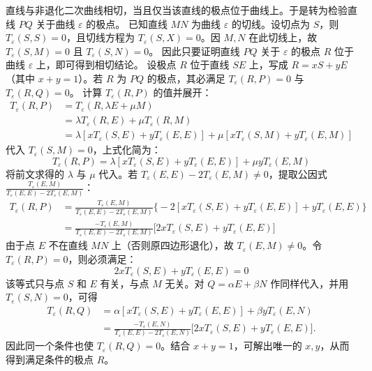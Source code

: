 \begin{solution}
直线与非退化二次曲线相切，当且仅当该直线的极点位于曲线上。于是转为检验直线 $PQ$ 关于曲线 $\varepsilon$ 的极点。
已知直线 $MN$ 为曲线 $\varepsilon$ 的切线。设切点为 $S$，则 $T_\varepsilon(S,S) = 0$，且切线方程为 $T_\varepsilon(S,X) = 0$。因 $M, N$ 在此切线上，故 $T_\varepsilon(S,M) = 0$ 且 $T_\varepsilon(S,N) = 0$。
因此只要证明直线 $PQ$ 关于 $\varepsilon$ 的极点 $R$ 位于曲线 $\varepsilon$ 上，即可得到相切结论。
设极点 $R$ 位于直线 $SE$ 上，写成 $R = xS + yE$（其中 $x + y = 1$）。若 $R$ 为 $PQ$ 的极点，其必满足 $T_\varepsilon(R,P) = 0$ 与 $T_\varepsilon(R,Q) = 0$。
计算 $T_\varepsilon(R,P)$ 的值并展开：
\begin{align*}
T_\varepsilon(R,P) &= T_\varepsilon(R, \lambda E + \mu M) \\
&= \lambda T_\varepsilon(R,E) + \mu T_\varepsilon(R,M) \\
&= \lambda [x T_\varepsilon(S,E) + y T_\varepsilon(E,E)] + \mu [x T_\varepsilon(S,M) + y T_\varepsilon(E,M)]
\end{align*}
代入 $T_\varepsilon(S,M) = 0$，上式化简为：
\[ T_\varepsilon(R,P) = \lambda [x T_\varepsilon(S,E) + y T_\varepsilon(E,E)] + \mu y T_\varepsilon(E,M) \]
将前文求得的 $\lambda$ 与 $\mu$ 代入。若 $T_\varepsilon(E,E) - 2T_\varepsilon(E,M) \neq 0$，提取公因式 $\frac{T_\varepsilon(E,M)}{T_\varepsilon(E,E) - 2T_\varepsilon(E,M)}$：
\begin{align*}
T_\varepsilon(R,P) &= \frac{T_\varepsilon(E,M)}{T_\varepsilon(E,E) - 2T_\varepsilon(E,M)} \big\{ -2 [x T_\varepsilon(S,E) + y T_\varepsilon(E,E)] + y T_\varepsilon(E,E) \big\} \\
&= \frac{-T_\varepsilon(E,M)}{T_\varepsilon(E,E) - 2T_\varepsilon(E,M)} \big[ 2x T_\varepsilon(S,E) + y T_\varepsilon(E,E) \big]
\end{align*}
由于点 $E$ 不在直线 $MN$ 上（否则原四边形退化），故 $T_\varepsilon(E,M) \neq 0$。令 $T_\varepsilon(R,P) = 0$，则必须满足：
\[ 2x T_\varepsilon(S,E) + y T_\varepsilon(E,E) = 0 \]
该等式只与点 $S$ 和 $E$ 有关，与点 $M$ 无关。对 $Q=\alpha E+\beta N$ 作同样代入，并用 $T_\varepsilon(S,N)=0$，可得
\begin{align*}
T_\varepsilon(R,Q)
&=\alpha [xT_\varepsilon(S,E)+yT_\varepsilon(E,E)]+\beta yT_\varepsilon(E,N)\\
&=\frac{-T_\varepsilon(E,N)}{T_\varepsilon(E,E)-2T_\varepsilon(E,N)}
\bigl[2xT_\varepsilon(S,E)+yT_\varepsilon(E,E)\bigr].
\end{align*}
因此同一个条件也使 $T_\varepsilon(R,Q)=0$。结合 $x + y = 1$，可解出唯一的 $x, y$，从而得到满足条件的极点 $R$。\\

\end{solution}
